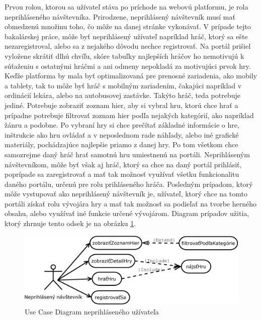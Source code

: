 Prvou rolou, ktorou sa užívateľ stáva po príchode na webovú platformu, je rola neprihláseného návštevníka. Prirodzene, neprihlásený návštevník musí mať obmedzenú množinu toho, čo môže na danej stránke vykonávať. V prípade tejto bakalárskej práce, môže byť neprihlásený užívateľ napríklad hráč, ktorý sa ešte nezaregistroval, alebo sa z nejakého dôvodu nechce registrovať. Na portál prišiel vyložene skrátiť dlhú chvíľu, skóre tabuľky najlepších hráčov ho nemotivujú k súťaženiu s ostatnými hráčmi a ani odmeny nepokladá za motivujúci prvok hry. Keďže platforma by mala byť optimalizovaná pre prenosné zariadenia, ako mobily a tablety, tak to môže byť hráč s mobilným zariadením, čakajúci napríklad v ordinácií lekára, alebo na autobusovej zastávke. Takýto hráč, teda potrebuje jediné. Potrebuje zobraziť zoznam hier, aby si vybral hru, ktorú chce hrať a prípadne potrebuje filtrovať zoznam hier podľa nejakých kategórií, ako napríklad žánru a podobne. Po vybraní hry si chce prečítať  základné informácie o hre, inštrukcie ako hru ovládať a v neposlednom rade náhľady, alebo iné grafické materiály, pochádzajúce najlepšie priamo z danej hry. Po tom všetkom chce samozrejme daný hráč hrať samotnú hru umiestnenú na portáli. Neprihláseným návštevníkom, môže byť však aj hráč, ktorý sa chce na daný portál prihlásiť, poprípade sa zaregistrovať a mať tak možnosť využívať všetku funkcionalitu daného portálu, určenú pre rolu prihláseného hráča. Posledným prípadom, ktorý môže vystupovať  ako neprihlásený návštevník je, užívateľ, ktorý chce na tomto portáli získať rolu vývojára hry a mať tak možnosť sa podieľať na tvorbe herného obsahu, alebo využívať iné funkcie určené vývojárom. Diagram prípadov užitia, ktorý zhrnuje tento odsek je na obrázku \ref{fig:ucdneprihlaseny}.
\begin{figure}[h]
  \centering
  \includegraphics[scale=0.43]{fig/ucd-neprihlaseny.eps}
  \caption{Use Case Diagram neprihláseného užívateľa}
  \label{fig:ucdneprihlaseny}
\end{figure}


